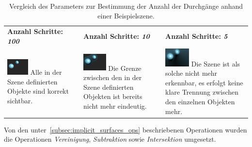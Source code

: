 \begin{table}[H]
    \centering
    \caption{Vergleich des Parameters zur Bestimmung der Anzahl der
        Durchgänge anhand einer Beispielszene.}\label{table:sphere_tracing_steps}
    \begin{tabular}{p{}p{}p{}}
        \toprule
            \textbf{Anzahl Schritte: \textit{100}} &
            \textbf{Anzahl Schritte: \textit{10}}  &
            \textbf{Anzahl Schritte: \textit{5}}   \\
        \cmidrule(r){1-1}\cmidrule(lr){2-2}\cmidrule(l){3-3}
            \includegraphics[width=0.3\textwidth]{img/sphere_tracing_steps_full.pdf} \newline
            Alle in der Szene definierten Objekte sind korrekt sichtbar. &
            \includegraphics[width=0.3\textwidth]{img/sphere_tracing_steps_less.pdf} \newline
            Die Grenze zwischen den in der Szene definierten Objekten
            ist bereits nicht mehr eindeutig. &
            \includegraphics[width=0.3\textwidth]{img/sphere_tracing_steps_min.pdf} \newline
            Die Szene ist als solche nicht mehr erkennbar, es erfolgt
            keine klare Trennung zwischen den einzelnen Objekten mehr.  \\
        \bottomrule
    \end{tabular}
\end{table}

Von den unter~\autoref{subsec:implicit_surfaces_ops} beschriebenen
Operationen wurden die Operationen \textit{Vereinigung}, \textit{Subtraktion} sowie
\textit{Intersektion} umgesetzt.

